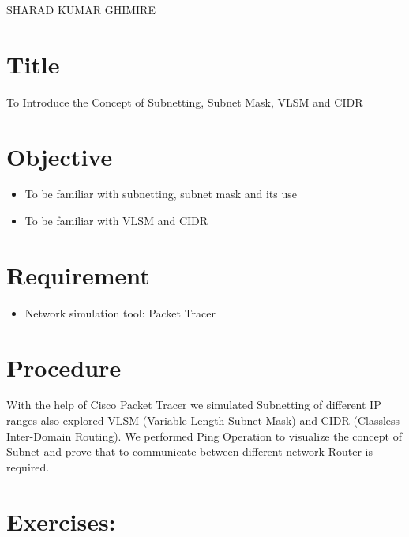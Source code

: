 \documentclass[a4paper,11pt]{article}
\begin{document}
{SHARAD KUMAR GHIMIRE}

\renewcommand{\contentsname}{Table of Contents}
\tableofcontents

\pagebreak
\lstlistoflistings
\pagebreak
\listoffigures
\pagebreak
{}

\section{Title} {\large To Introduce the Concept of Subnetting, Subnet Mask, VLSM and CIDR}
\section{Objective}
\begin{itemize}
    \item To be familiar with subnetting, subnet mask and its use
    \item To be familiar with VLSM and CIDR

\end{itemize}
\section{Requirement}
\begin{itemize}
    \item Network simulation tool: Packet Tracer
\end{itemize}

\section{Procedure}

With the help of Cisco Packet Tracer we simulated Subnetting of  different IP ranges also explored  VLSM (Variable Length Subnet Mask) and  CIDR (Classless Inter-Domain Routing).
We performed Ping Operation to visualize the concept of Subnet and prove that to communicate between different network Router is required.



\pagebreak
\section{Exercises:}
\end{document}
